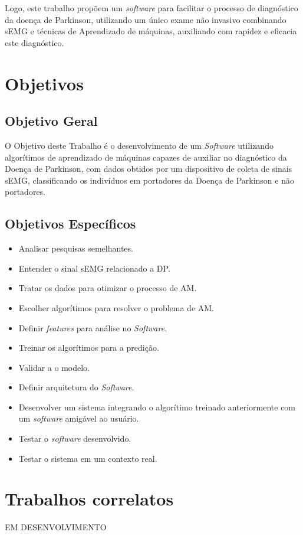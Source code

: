Logo, este trabalho propõem um \textit{software} para facilitar o processo de diagnóstico da doença de Parkinson, utilizando um único exame não invasivo combinando sEMG e técnicas de  Aprendizado de máquinas, auxiliando com rapidez e eficacia este diagnóstico. 

\section{Objetivos}
\subsection{Objetivo Geral}
O Objetivo deste Trabalho é o desenvolvimento de um \textit{Software} utilizando algorítimos de aprendizado de máquinas capazes de auxiliar no diagnóstico da Doença de Parkinson, com dados obtidos por um dispositivo de coleta de sinais sEMG, classificando os indivíduos em portadores da Doença de Parkinson e não portadores.

\subsection{Objetivos Específicos}
\begin{itemize}
    \item Analisar pesquisas semelhantes.
    \item Entender o sinal sEMG relacionado a DP.
    \item Tratar os dados para otimizar o processo de AM.
    \item Escolher algorítimos para resolver o problema de AM.
    \item Definir \textit{features} para análise no \textit{Software}.
    \item Treinar os algorítimos para a predição.
    \item Validar a o modelo.
    \item Definir arquitetura do \textit{Software}.
    \item Desenvolver um sistema integrando o algorítimo treinado anteriormente com um \textit{software} amigável ao usuário.
    \item Testar o \textit{software} desenvolvido.
    \item Testar o sistema em um contexto real.
\end{itemize}

\section{Trabalhos correlatos}
EM DESENVOLVIMENTO